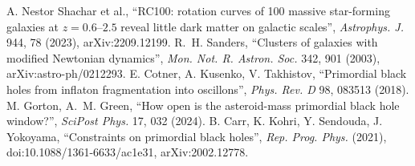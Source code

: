  A. Nestor Shachar et al., ``RC100: rotation curves of 100 massive star-forming galaxies at $z=0.6$--$2.5$ reveal
little dark matter on galactic scales'', \emph{Astrophys. J.} 944, 78 (2023), arXiv:2209.12199.
 R.~H. Sanders, ``Clusters of galaxies with modified Newtonian dynamics'', \emph{Mon. Not. R. Astron. Soc.} 342, 901
(2003), arXiv:astro-ph/0212293.
 E. Cotner, A. Kusenko, V. Takhistov, ``Primordial black holes from inflaton fragmentation into oscillons'', \emph{Phys.
Rev. D} 98, 083513 (2018).
 M. Gorton, A.~M. Green, ``How open is the asteroid-mass primordial black hole window?'', \emph{SciPost Phys.} 17, 032
(2024).
 B. Carr, K. Kohri, Y. Sendouda, J. Yokoyama, ``Constraints on primordial black holes'', \emph{Rep. Prog. Phys.} (2021),
doi:10.1088/1361-6633/ac1e31, arXiv:2002.12778.
